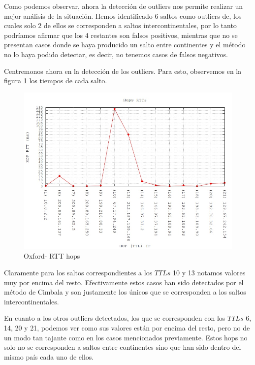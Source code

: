 Como podemos observar, ahora la detección de outliers nos permite realizar un mejor análisis de la situación. Hemos identificado 6 saltos como outliers de, los cuales solo 2 de ellos se corresponden a saltos intercontinentales, por lo tanto podríamos afirmar que los 4 restantes son falsos positivos, mientras que no se presentan casos donde se haya producido un salto entre continentes y el método no lo haya podido detectar, es decir, no tenemos casos de falsos negativos.


Centremonos ahora en la detección de los outliers. Para esto, observemos en la figura \ref{tiempos-oxford} los tiempos de cada salto.

\begin{figure}[!htbp]
  \centering
    \includegraphics[scale=0.5]{imagenes/oxford-graficos/traceroute-oxford.jpg}
  \caption{Oxford- RTT hops}
  \label{tiempos-oxford}
\end{figure}


Claramente para los saltos correspondientes a los $TTLs$ 10 y 13 notamos valores muy por encima del resto. Efectivamente estos casos han sido detectados por el método de Cimbala y son justamente los únicos que se corresponden a los saltos intercontinentales.

En cuanto a los otros outliers detectados, los que se corresponden con los $TTLs$ 6, 14, 20 y 21, podemos ver como sus valores están por encima del resto, pero no de un modo tan tajante como en los casos mencionados previamente. Estos hops no solo no se corresponden a saltos entre continentes sino que han sido dentro del mismo país cada uno de ellos.


